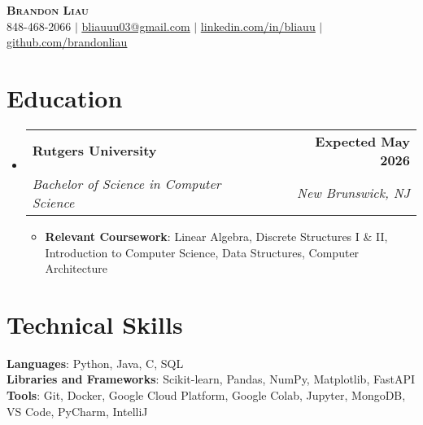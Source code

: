 \documentclass[letterpaper,11pt]{article}
\makeatletter
\newcommand{\resumeItem}[1]{
  \item\small{
    {#1 \vspace{-2pt}}
  }
}
\newcommand{\resumeSubheading}[4]{
  \vspace{-2pt}\item
    \begin{tabular*}{0.97\textwidth}[t]{l@{\extracolsep{\fill}}r}
      \textbf{#1} & #2 \\
      \textit{\small#3} & \textit{\small #4} \\
    \end{tabular*}\vspace{-7pt}
}
\newcommand{\resumeSubHeadingListStart}{\begin{itemize}[leftmargin=0.15in, label={}]}
\newcommand{\resumeSubHeadingListEnd}{\end{itemize}}
\newcommand{\resumeItemListStart}{\begin{itemize}}
\newcommand{\resumeItemListEnd}{\end{itemize}\vspace{-3pt}}
\makeatother
\begin{document}
\begin{center}
    \textbf{\Huge \scshape Brandon Liau} \\ \vspace{8pt}
    \small {} 848-468-2066 $|$ 
    \href{mailto:x@x.com}{ \underline{bliauuu03@gmail.com}} $|$ 
    \href{https://linkedin.com/in/bliauu}{ \underline{linkedin.com/in/bliauu}} $|$
    \href{https://github.com/brandonliau}{ \underline{github.com/brandonliau}}
\end{center}


\section{Education}
  \resumeSubHeadingListStart
    \resumeSubheading
      {Rutgers University}{\textbf{Expected May 2026}}
      {Bachelor of Science in Computer Science}{New Brunswick, NJ}
      \resumeItemListStart
        \resumeItem{\textbf{Relevant Coursework}: Linear Algebra, Discrete Structures I \& II, Introduction to Computer Science, Data Structures, Computer Architecture}
      \resumeItemListEnd
  \resumeSubHeadingListEnd


\section{Technical Skills}
 \begin{itemize}[leftmargin=0.15in, label={}]
    \small{\item{
     \textbf{Languages}{: Python, Java, C, SQL} \vspace{1.5pt}\\
     \textbf{Libraries and Frameworks}{: Scikit-learn, Pandas, NumPy, Matplotlib, FastAPI} \vspace{1.5pt}\\
     \textbf{Tools}{: Git, Docker, Google Cloud Platform, Google Colab, Jupyter, MongoDB, VS Code, PyCharm, IntelliJ} \\
    }}
 \end{itemize}


\end{document}
